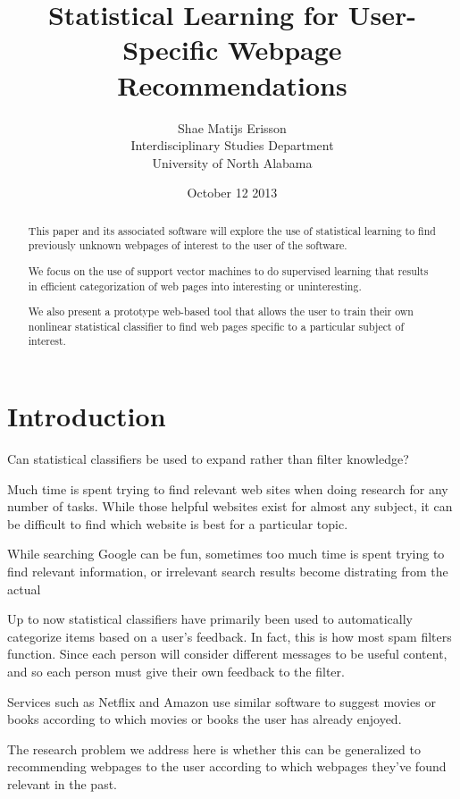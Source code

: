 \documentclass[12pt]{article}
\author{Shae Matijs Erisson\\Interdisciplinary Studies Department\\University of North Alabama}
\title{Statistical Learning for User-Specific Webpage Recommendations}
\begin{document}
\date{October 12 2013}
\maketitle{}
\pagebreak{}

\begin{abstract}
  This paper and its associated software will explore the use of statistical learning to find previously
  unknown webpages of interest to the user of the software.

  We focus on the use of support vector machines to do supervised learning that results in efficient
  categorization of web pages into interesting or uninteresting.

  We also present a prototype web-based tool that allows the user to train their own nonlinear statistical
  classifier to find web pages specific to a particular subject of interest.
\end{abstract}
\pagebreak{}
\section{Introduction}
Can statistical classifiers be used to expand rather than filter knowledge?

Much time is spent trying to find relevant web sites when doing research for any number of tasks. While those
helpful websites exist for almost any subject, it can be difficult to find which website is best for a
particular topic.

While searching Google can be fun, sometimes too much time is spent trying to find relevant information, or
irrelevant search results become distrating from the actual

Up to now statistical classifiers have primarily been used to automatically categorize items based on a user's
feedback. In fact, this is how most spam filters function. Since each person will consider different messages
to be useful content, and so each person must give their own feedback to the filter.

Services such as Netflix and Amazon use similar software to suggest movies or books according to which movies
or books the user has already enjoyed.

The research problem we address here is whether this can be generalized to recommending webpages to the user
according to which webpages they've found relevant in the past.
\end{document}
